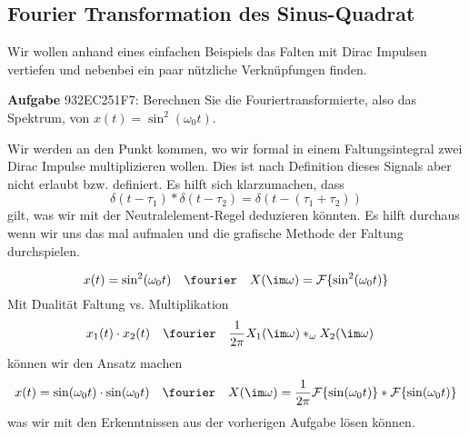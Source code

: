 \newpage
\subsection{Fourier Transformation des Sinus-Quadrat}
\label{sec:932EC251F7}
\begin{Ziel}
Wir wollen anhand eines einfachen Beispiels das Falten mit Dirac Impulsen
vertiefen und nebenbei ein paar nützliche Verknüpfungen finden.
\end{Ziel}
\textbf{Aufgabe} {\tiny 932EC251F7}: Berechnen Sie die Fouriertransformierte, also
das Spektrum, von $x(t)=\sin^2(\omega_0 t)$.
\begin{Werkzeug}
Wir werden an den Punkt kommen, wo wir formal in einem Faltungsintegral
zwei Dirac Impulse multiplizieren wollen. Dies ist nach Definition dieses Signals
aber nicht erlaubt bzw. definiert.
Es hilft sich klarzumachen, dass
\begin{equation}
  \delta(t-\tau_1) \ast \delta(t-\tau_2) = \delta(t-(\tau_1+\tau_2))
\end{equation}
gilt, was wir mit der Neutralelement-Regel deduzieren könnten.
Es hilft durchaus wenn wir uns das mal aufmalen und die grafische Methode der
Faltung durchspielen.
\end{Werkzeug}
\begin{Ansatz}
\begin{equation}
  x(t)  = \sin^2(\omega_0 t) \quad\fourier\quad X(\im\omega) = \mathcal{F}\{\sin^2(\omega_0 t)\}
\end{equation}
Mit Dualität Faltung vs. Multiplikation
\begin{align}
x_1(t) \cdot x_2(t) &\quad \fourier \quad \frac{1}{2\pi} X_1(\im\omega) \ast_\omega X_2(\im\omega)
\end{align}
können wir den Ansatz machen
\begin{equation}
  x(t)  = \sin(\omega_0 t)\cdot \sin(\omega_0 t) \quad\fourier\quad X(\im\omega) = \frac{1}{2\pi} \mathcal{F}\{\sin(\omega_0 t)\} \ast \mathcal{F}\{\sin(\omega_0 t)\}
\end{equation}
was wir mit den Erkenntnissen aus der vorherigen Aufgabe lösen können.
\end{Ansatz}
